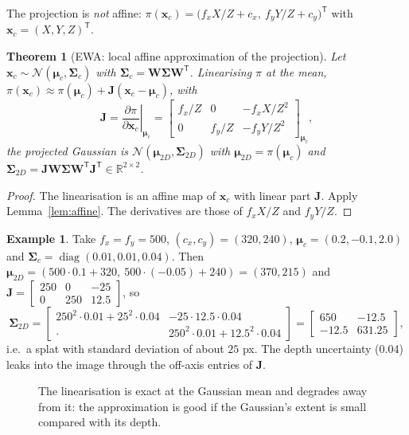 \documentclass[11pt,a4paper]{article}
\newcommand{\R}{\mathbb{R}}
\newcommand{\N}{\mathcal{N}}
\newcommand{\T}{^{\mathsf T}}
\DeclareMathOperator{\diag}{diag}
\theoremstyle{definition}
\newtheorem{example}[definition]{Example}
\theoremstyle{algstyle}
\theoremstyle{plain}
\newtheorem{theorem}[definition]{Theorem}
\theoremstyle{remark}
\begin{document}
The projection is \emph{not} affine: $\pi(\bm x_c)=\big(f_xX/Z+c_x,\ f_yY/Z+c_y\big)\T$ with $\bm x_c=(X,Y,Z)\T$.

\begin{theorem}[EWA: local affine approximation of the projection]\label{thm:ewa}
Let $\bm x_c\sim\N(\bm\mu_c,\bm\Sigma_c)$ with $\bm\Sigma_c=\bm W\bm\Sigma\bm W\T$. Linearising $\pi$ at the mean,
$\pi(\bm x_c)\approx\pi(\bm\mu_c)+\bm J(\bm x_c-\bm\mu_c)$, with
\[
\bm J=\left.\frac{\partial\pi}{\partial\bm x_c}\right|_{\bm\mu_c}=
\begin{bmatrix}f_x/Z&0&-f_xX/Z^2\\0&f_y/Z&-f_yY/Z^2\end{bmatrix}_{\bm\mu_c},
\]
the projected Gaussian is $\N(\bm\mu_{2D},\bm\Sigma_{2D})$ with $\bm\mu_{2D}=\pi(\bm\mu_c)$ and
$\bm\Sigma_{2D}=\bm J\bm W\bm\Sigma\bm W\T\bm J\T\in\R^{2\times2}$.
\end{theorem}
\begin{proof}
The linearisation is an affine map of $\bm x_c$ with linear part $\bm J$. Apply Lemma~\ref{lem:affine}. The derivatives are those of $f_xX/Z$ and $f_yY/Z$.
\end{proof}

\begin{example}
Take $f_x=f_y=500$, $(c_x,c_y)=(320,240)$, $\bm\mu_c=(0.2,-0.1,2.0)$ and $\bm\Sigma_c=\diag(0.01,0.01,0.04)$. Then $\bm\mu_{2D}=(500\cdot0.1+320,\ 500\cdot(-0.05)+240)=(370,215)$ and
$\bm J=\begin{bmatrix}250&0&-25\\0&250&12.5\end{bmatrix}$, so
\[
\bm\Sigma_{2D}=\begin{bmatrix}250^2\cdot0.01+25^2\cdot0.04&-25\cdot12.5\cdot0.04\\ \cdot&250^2\cdot0.01+12.5^2\cdot0.04\end{bmatrix}
=\begin{bmatrix}650&-12.5\\-12.5&631.25\end{bmatrix},
\]
i.e.\ a splat with standard deviation of about $25$ px. The depth uncertainty (0.04) leaks into the image through the off-axis entries of $\bm J$.
\end{example}

\begin{figure}[htbp]
\centering
{}
\caption{The linearisation is exact at the Gaussian mean and degrades away from it: the approximation is good if the Gaussian's extent is small compared with its depth.}
\end{figure}
\end{document}
